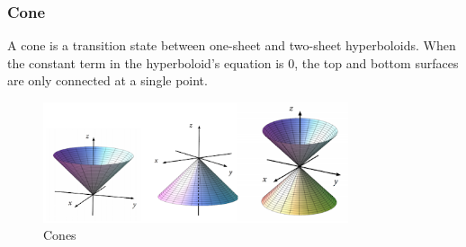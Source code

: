 \subsubsection{Cone}
A cone is a transition state between one-sheet and two-sheet hyperboloids.
When the constant term in the hyperboloid's equation is 0, the top and bottom surfaces are only connected at a single point.

\begin{figure}[H]
	\centering
	\includegraphics[width=0.8\textwidth]{./differentialMultivariableCalculus/cones.png}
	\caption{Cones}
\end{figure}